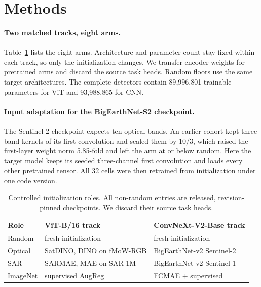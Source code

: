 \section{Methods}
\label{sec:methods}

\paragraph{Two matched tracks, eight arms.}
Table~\ref{tab:arms-short} lists the eight arms. Architecture and parameter
count stay fixed within each track, so only the initialization changes.
We transfer encoder weights for pretrained arms and discard the source task
heads. Random floors use the same target architectures. The complete
detectors contain 89{,}996{,}801 trainable parameters for ViT and
93{,}988{,}865 for
CNN.

\paragraph{Input adaptation for the BigEarthNet-S2 checkpoint.}
The Sentinel-2 checkpoint expects ten optical bands. An earlier cohort kept
three band kernels of its first convolution and scaled them by 10/3, which
raised the first-layer weight norm 5.85-fold and left the arm at or below
random. Here the target model keeps its seeded three-channel first
convolution and loads every other pretrained tensor. All 32 cells were then
retrained from initialization under one code version.

\begin{table}[t]
\centering
\caption{Controlled initialization roles. All non-random entries are
released, revision-pinned checkpoints. We discard their source task heads.}
\label{tab:arms-short}
\small
\setlength{\tabcolsep}{5pt}
\begin{tabular}{@{}lll@{}}
\toprule
Role & ViT-B/16 track & ConvNeXt-V2-Base track \\
\midrule
Random & fresh initialization & fresh initialization \\
Optical & SatDINO, DINO on fMoW-RGB & BigEarthNet-v2 Sentinel-2 \\
SAR & SARMAE, MAE on SAR-1M & BigEarthNet-v2 Sentinel-1 \\
ImageNet & supervised AugReg & FCMAE $+$ supervised \\
\bottomrule
\end{tabular}
\end{table}

